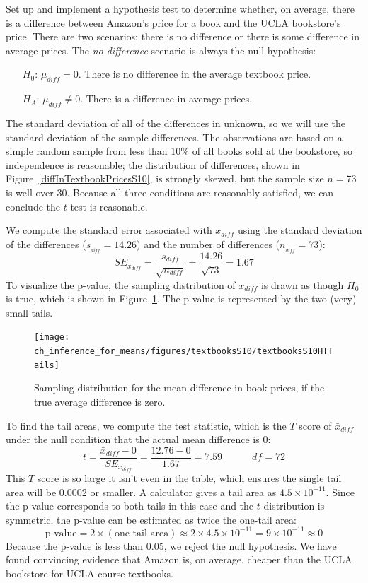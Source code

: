 \begin{example}{Set up and implement a hypothesis test to determine whether, on average, there is a difference between Amazon's price for a book and the UCLA bookstore's price.}
\label{htForDiffInUCLAAndAmazonTextbookPrices}
There are two scenarios: there is no difference or there is some difference in average prices. The \emph{no difference} scenario is always the null hypothesis:
\begin{itemize}
\setlength{\itemsep}{0mm}
\item[$H_0$:] $\mu_{diff}=0$. There is no difference in the average textbook price.
\item[$H_A$:] $\mu_{diff} \neq 0$. There is a difference in average prices.
\end{itemize}
The standard deviation of all of the differences in unknown, so we will use the standard deviation of the sample differences. The observations are based on a simple random sample from less than 10\% of all books sold at the bookstore, so independence is reasonable; the distribution of differences, shown in Figure~\ref{diffInTextbookPricesS10}, is strongly skewed, but the sample size $n=73$ is well over 30. Because all three conditions are reasonably satisfied, we can conclude the $t$-test is reasonable.

We compute the standard error associated with $\bar{x}_{diff}$ using the standard deviation of the differences ($s_{_{diff}}=14.26$) and the number of differences ($n_{_{diff}}=73$):
$$SE_{\bar{x}_{diff}} = \frac{s_{diff}}{\sqrt{n_{diff}}} = \frac{14.26}{\sqrt{73}} = 1.67$$
To visualize the p-value, the sampling distribution of $\bar{x}_{diff}$ is drawn as though $H_0$ is true, which is shown in Figure~\ref{textbooksS10HTTails}. The p-value is represented by the two (very) small tails.

\begin{figure}
\centering
\texttt{[image: ch\_inference\_for\_means/figures/textbooksS10/textbooksS10HTTails]}
\caption{Sampling distribution for the mean difference in book prices, if the true average difference is zero.}
\label{textbooksS10HTTails}
\end{figure}

To find the tail areas, we compute the test statistic, which is the $T$ score of $\bar{x}_{diff}$ under the null condition that the actual mean difference is 0:
$$t = \frac{\bar{x}_{diff} - 0}{SE_{x_{diff}}} = \frac{12.76 - 0}{1.67} = 7.59  \quad \quad \quad df=72$$
This $T$ score is so large it isn't even in the table, which ensures the single tail area will be 0.0002 or smaller. A calculator gives a tail area as $4.5\times 10^{-11}$. Since the p-value corresponds to both tails in this case and the $t$-distribution is symmetric, the p-value can be estimated as twice the one-tail area:
$$\text{p-value} = 2\times (\text{one tail area}) \approx 2\times 4.5\times 10^{-11} = 9\times 10^{-11}\approx 0$$
Because the p-value is less than 0.05, we reject the null hypothesis. We have found convincing evidence that Amazon is, on average, cheaper than the UCLA bookstore for UCLA course textbooks.
\end{example}

